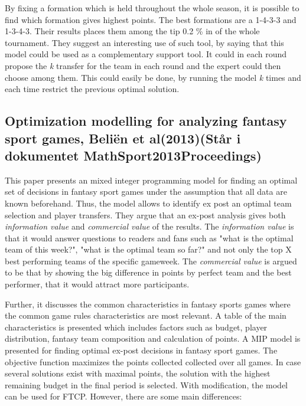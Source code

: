 \newpar

By fixing a formation which is held throughout the whole season, it is possible to find which formation gives highest points. The best formations are a 1-4-3-3 and 1-3-4-3. Their results places them among the tip 0.2 \% in of the whole tournament. They suggest an interesting use of such tool, by saying that this model could be used as a complementary support tool. It could in each round propose the \textit{k} transfer for the team in each round and the expert could then choose among them. This could easily be done, by running the model \textit{k} times and each time restrict the previous optimal solution.  

\begin{comment}
De skriver hvilke formasjoner som er mulig å bruke. Det burde vi også gjøre. 
\end{comment}

\subsection{Optimization modelling for analyzing fantasy sport games, Beliën et al(2013)(Står i dokumentet MathSport2013Proceedings)}

This paper presents an mixed integer programming model for finding an optimal set of decisions in fantasy sport games under the assumption that all data are known beforehand. Thus, the model allows to identify ex post an optimal team selection and player transfers. They argue that an ex-post analysis gives both \textit{information value} and \textit{commercial value} of the results. The \textit{information value} is that it would answer questions to readers and fans such as "what is the optimal team of this week?", "what is the optimal team so far?" and not only the top X best performing teams of the specific gameweek. The \textit{commercial value} is argued to be that by showing the big difference in points by perfect team and the best performer, that it would attract more participants. 

\newpar

Further, it discusses the common characteristics in fantasy sports games where the common game rules characteristics are most relevant. A table of the main characteristics is presented which includes factors such as budget, player distribution, fantasy team composition and calculation of points. A MIP model is presented for finding optimal ex-post decisions in fantasy sport games. The objective function maximizes the points collected collected over all games. In case several solutions exist with maximal points, the solution with the highest remaining budget in the final period is selected.  With modification, the model can be used for FTCP. However, there are some main differences: 

